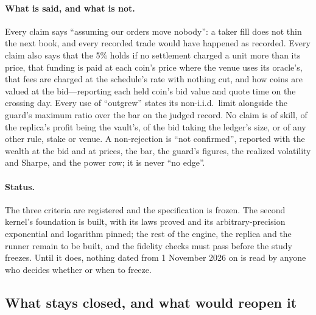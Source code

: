 \documentclass[11pt]{article}
\begin{document}
\paragraph{What is said, and what is not.} Every claim says ``assuming our orders move nobody'': a taker fill does not thin the next book, and every recorded trade would have happened as recorded. Every claim also says that the 5\% holds if no settlement charged a unit more than its price, that funding is paid at each coin's price where the venue uses its oracle's, that fees are charged at the schedule's rate with nothing cut, and how coins are valued at the bid---reporting each held coin's bid value and quote time on the crossing day. Every use of ``outgrew'' states its non-i.i.d.\ limit alongside the guard's maximum ratio over the bar on the judged record. No claim is of skill, of the replica's profit being the vault's, of the bid taking the ledger's size, or of any other rule, stake or venue. A non-rejection is ``not confirmed'', reported with the wealth at the bid and at prices, the bar, the guard's figures, the realized volatility and Sharpe, and the power row; it is never ``no edge''.

\paragraph{Status.} The three criteria are registered and the specification is frozen. The second kernel's foundation is built, with its laws proved and its arbitrary-precision exponential and logarithm pinned; the rest of the engine, the replica and the runner remain to be built, and the fidelity checks must pass before the study freezes. Until it does, nothing dated from 1 November 2026 on is read by anyone who decides whether or when to freeze.

\subsection{What stays closed, and what would reopen it}\label{sec:closed}
\end{document}
